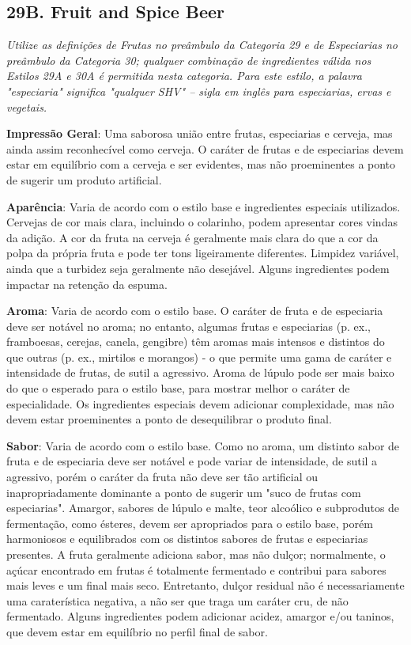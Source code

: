 \subsection*{29B. Fruit and Spice Beer}
\textit{Utilize as definições de Frutas no preâmbulo da Categoria 29 e de Especiarias no preâmbulo da Categoria 30; qualquer combinação de ingredientes válida nos Estilos 29A e 30A é permitida nesta categoria. Para este estilo, a palavra "especiaria" significa "qualquer SHV" – sigla em inglês para especiarias, ervas e vegetais.}

\textbf{Impressão Geral}: Uma saborosa união entre frutas, especiarias e cerveja, mas ainda assim reconhecível como cerveja. O caráter de frutas e de especiarias devem estar em equilíbrio com a cerveja e ser evidentes, mas não proeminentes a ponto de sugerir um produto artificial.

\textbf{Aparência}: Varia de acordo com o estilo base e ingredientes especiais utilizados. Cervejas de cor mais clara, incluindo o colarinho, podem apresentar cores vindas da adição. A cor da fruta na cerveja é geralmente mais clara do que a cor da polpa da própria fruta e pode ter tons ligeiramente diferentes. Limpidez variável, ainda que a turbidez seja geralmente não desejável. Alguns ingredientes podem impactar na retenção da espuma.

\textbf{Aroma}: Varia de acordo com o estilo base. O caráter de fruta e de especiaria deve ser notável no aroma; no entanto, algumas frutas e especiarias (p. ex., framboesas, cerejas, canela, gengibre) têm aromas mais intensos e distintos do que outras (p. ex., mirtilos e morangos) - o que permite uma gama de caráter e intensidade de frutas, de sutil a agressivo. Aroma de lúpulo pode ser mais baixo do que o esperado para o estilo base, para mostrar melhor o caráter de especialidade. Os ingredientes especiais devem adicionar complexidade, mas não devem estar proeminentes a ponto de desequilibrar o produto final.

\textbf{Sabor}: Varia de acordo com o estilo base. Como no aroma, um distinto sabor de fruta e de especiaria deve ser notável e pode variar de intensidade, de sutil a agressivo, porém o caráter da fruta não deve ser tão artificial ou inapropriadamente dominante a ponto de sugerir um "suco de frutas com especiarias". Amargor, sabores de lúpulo e malte, teor alcoólico e subprodutos de fermentação, como ésteres, devem ser apropriados para o estilo base, porém harmoniosos e equilibrados com os distintos sabores de frutas e especiarias presentes. A fruta geralmente adiciona sabor, mas não dulçor; normalmente, o açúcar encontrado em frutas é totalmente fermentado e contribui para sabores mais leves e um final mais seco. Entretanto, dulçor residual não é necessariamente uma caraterística negativa, a não ser que traga um caráter cru, de não fermentado. Alguns ingredientes podem adicionar acidez, amargor e/ou taninos, que devem estar em equilíbrio no perfil final de sabor.


